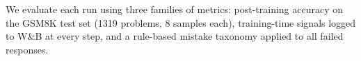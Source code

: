 We evaluate each run using three families of metrics: post-training accuracy on the GSM8K test set (1319 problems, 8 samples each), training-time signals logged to W\&B at every step, and a rule-based mistake taxonomy applied to all failed responses.


